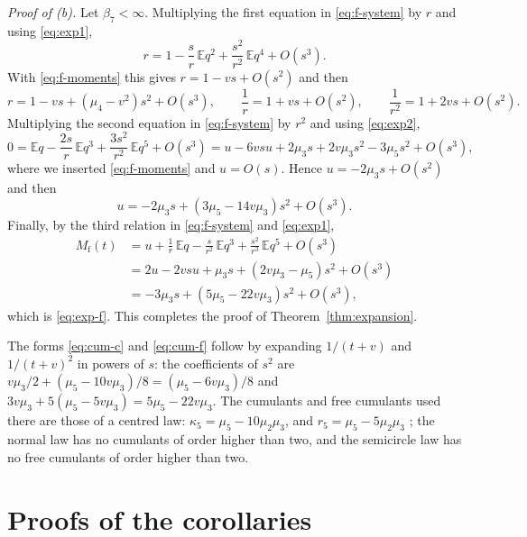 \documentclass[11pt]{amsart}
\theoremstyle{definition}
\newcommand{\E}{\mathbb{E}}
\newcommand{\Mfr}{M_{\mathrm{f}}}
\begin{document}
\emph{Proof of {\rm(b)}.} Let $\beta_7<\infty$. Multiplying the first equation in \eqref{eq:f-system} by $r$ and
using \eqref{eq:exp1},
\[
r=1-\frac sr\,\E q^2+\frac{s^2}{r^2}\,\E q^4+O(s^3).
\]
With \eqref{eq:f-moments} this gives $r=1-vs+O(s^2)$ and then
\[
r=1-vs+(\mu_4-v^2)s^2+O(s^3),\qquad \frac1r=1+vs+O(s^2),\qquad \frac1{r^2}=1+2vs+O(s^2).
\]
Multiplying the second equation in \eqref{eq:f-system} by $r^2$ and using \eqref{eq:exp2},
\[
0=\E q-\frac{2s}{r}\,\E q^3+\frac{3s^2}{r^2}\,\E q^5+O(s^3)
=u-6vsu+2\mu_3s+2v\mu_3s^2-3\mu_5s^2+O(s^3),
\]
where we inserted \eqref{eq:f-moments} and $u=O(s)$. Hence $u=-2\mu_3s+O(s^2)$ and then
\[
u=-2\mu_3s+(3\mu_5-14v\mu_3)s^2+O(s^3).
\]
Finally, by the third relation in \eqref{eq:f-system} and \eqref{eq:exp1},
\begin{align*}
\Mfr(t)&=u+\frac1r\,\E q-\frac{s}{r^2}\,\E q^3+\frac{s^2}{r^3}\,\E q^5+O(s^3)\\
&=2u-2vsu+\mu_3s+(2v\mu_3-\mu_5)s^2+O(s^3)\\
&=-3\mu_3s+(5\mu_5-22v\mu_3)s^2+O(s^3),
\end{align*}
which is \eqref{eq:exp-f}. This completes the proof of Theorem~\ref{thm:expansion}.

The forms \eqref{eq:cum-c} and \eqref{eq:cum-f} follow by expanding $1/(t+v)$ and $1/(t+v)^2$ in powers of $s$: the
coefficients of $s^2$ are $v\mu_3/2+(\mu_5-10v\mu_3)/8=(\mu_5-6v\mu_3)/8$ and
$3v\mu_3+5(\mu_5-5v\mu_3)=5\mu_5-22v\mu_3$. The cumulants and free cumulants used there are those of a centred
law: $\kappa_5=\mu_5-10\mu_2\mu_3$, and $r_5=\mu_5-5\mu_2\mu_3$ \cite[Lecture~11]{NS}; the normal law has no
cumulants of order higher than two, and the semicircle law has no free cumulants of order higher than two.

\section{Proofs of the corollaries}\label{sec:cor}
\end{document}
